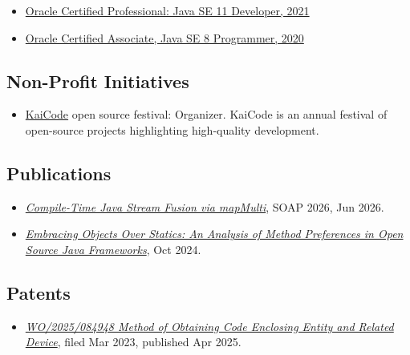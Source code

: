 \documentclass{vl}
\begin{document}
\begin{itemize}
    \itemsep0em
    \item \href{https://catalog-education.oracle.com/pls/certview/sharebadge?id=87F6A2FE819A5A5AF4120A05900AB28A461EE9A3EE9FBFA02721FADAEB3BCE19}{Oracle Certified Professional: Java SE 11 Developer, 2021}
    \item \href{https://www.credly.com/badges/e2d9ddda-20dc-433d-8ab7-18548fd0fd8f/public_url}{Oracle Certified Associate, Java SE 8 Programmer, 2020}
\end{itemize}

\subsection*{Non-Profit Initiatives}
\begin{itemize}
    \itemsep0em
    \item \href{https://www.kaicode.org}{KaiCode} open source festival: Organizer.
        KaiCode is an annual festival of open-source projects highlighting high-quality development.
\end{itemize}

\subsection*{Publications}
\begin{itemize}
    \itemsep0em
    \item\emph{\href{https://doi.org/10.1145/3814987.3814988}{Compile-Time Java Stream Fusion via mapMulti}}, SOAP 2026, Jun 2026.
    \item\emph{\href{https://arxiv.org/abs/2410.05631}{Embracing Objects Over Statics:
        An Analysis of Method Preferences
        in Open Source Java Frameworks}}, Oct 2024.
\end{itemize}

\subsection*{Patents}
\begin{itemize}
    \itemsep0em
    \item\emph{\href{https://patentscope.wipo.int/search/en/detail.jsf?docId=WO2025084948&_cid=P20-ME9V9B-07633-1}{WO/2025/084948 Method of Obtaining Code Enclosing Entity and Related Device}}, filed Mar 2023, published Apr 2025.
\end{itemize}
\end{document}
